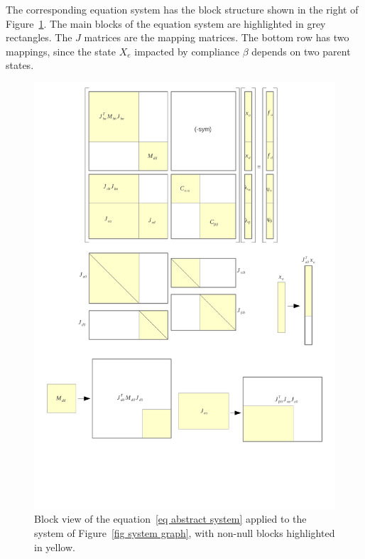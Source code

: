 The corresponding equation system has the block structure shown in the right of Figure~\ref{fig system matrix}.
The main blocks of the equation system are highlighted in grey rectangles. The $J$ matrices are the mapping matrices. The bottom row has two mappings, since the state $X_e$ impacted by compliance $\beta$ depends on two parent states.
\begin{figure}
\centering
 \includegraphics[clip,trim=5mm 185mm 40mm 0mm,width=0.7\linewidth]{system-bigmatrix.pdf}
\caption{Block view of the equation~\ref{eq abstract system} applied to the system of Figure~\ref{fig system graph}, with non-null blocks highlighted in yellow.}
\label{fig system matrix}
\end{figure}


